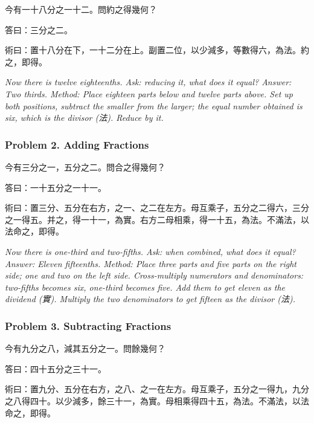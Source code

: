 \documentclass[11pt,a4paper]{article}
\newcommand{\zh}[1]{{\CJKfamily{}#1}}
\begin{document}
\begin{problembox}[title=\zh{問}]
\zh{今有一十八分之一十二。問約之得幾何？}
\end{problembox}
\begin{answerbox}[title=\zh{答}]
\zh{答曰：三分之二。}
\end{answerbox}
\begin{methodbox}[title=\zh{術}]
\zh{術曰：置十八分在下，一十二分在上。副置二位，以少減多，等數得六，為法。約之，即得。}
\end{methodbox}

\textit{Now there is twelve eighteenths. Ask: reducing it, what does it equal? Answer: Two thirds. Method: Place eighteen parts below and twelve parts above. Set up both positions, subtract the smaller from the larger; the equal number obtained is six, which is the divisor (\zh{法}). Reduce by it.}

\subsubsection*{Problem 2. Adding Fractions}

\begin{problembox}[title=\zh{問}]
\zh{今有三分之一，五分之二。問合之得幾何？}
\end{problembox}
\begin{answerbox}[title=\zh{答}]
\zh{答曰：一十五分之一十一。}
\end{answerbox}
\begin{methodbox}[title=\zh{術}]
\zh{術曰：置三分、五分在右方，之一、之二在左方。母互乘子，五分之二得六，三分之一得五。并之，得一十一，為實。右方二母相乘，得一十五，為法。不滿法，以法命之，即得。}
\end{methodbox}

\textit{Now there is one-third and two-fifths. Ask: when combined, what does it equal? Answer: Eleven fifteenths. Method: Place three parts and five parts on the right side; one and two on the left side. Cross-multiply numerators and denominators: two-fifths becomes six, one-third becomes five. Add them to get eleven as the dividend (\zh{實}). Multiply the two denominators to get fifteen as the divisor (\zh{法}).}

\subsubsection*{Problem 3. Subtracting Fractions}

\begin{problembox}[title=\zh{問}]
\zh{今有九分之八，減其五分之一。問餘幾何？}
\end{problembox}
\begin{answerbox}[title=\zh{答}]
\zh{答曰：四十五分之三十一。}
\end{answerbox}
\begin{methodbox}[title=\zh{術}]
\zh{術曰：置九分、五分在右方，之八、之一在左方。母互乘子，五分之一得九，九分之八得四十。以少減多，餘三十一，為實。母相乘得四十五，為法。不滿法，以法命之，即得。}
\end{methodbox}
\end{document}

